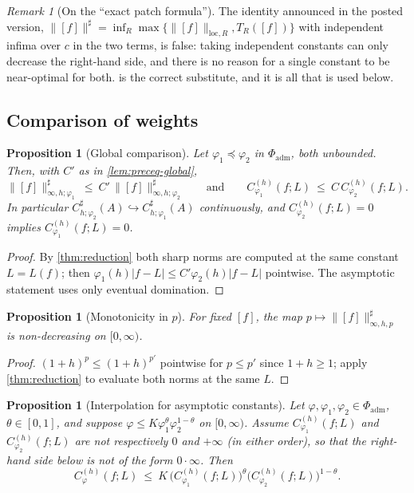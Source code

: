 \documentclass[11pt,a4paper]{article}
\numberwithin{equation}{section}
\theoremstyle{plain}
\newtheorem{proposition}[theorem]{Proposition}
\theoremstyle{definition}
\theoremstyle{remark}
\newtheorem{remark}[theorem]{Remark}
\begin{document}
\begin{remark}[On the ``exact patch formula'']
The identity announced in the posted version,
$\|[f]\|^{\sharp}=\inf_{R}\max\{\|[f]\|_{\mathrm{loc},R},T_R([f])\}$ with independent
infima over $c$ in the two terms, is false: taking independent constants can only decrease
the right-hand side, and there is no reason for a single constant to be near-optimal for
both.  is the correct substitute, and it is all that is used below.
\end{remark}

\subsection{Comparison of weights}

\begin{proposition}[Global comparison]\label{prop:global-comparison}
Let $\varphi_1\preceq\varphi_2$ in $\Phi_{\mathrm{adm}}$, both unbounded. Then, with $C'$
as in \cref{lem:preceq-global},
\[
\|[f]\|^{\sharp}_{\infty,h;\varphi_1}\ \le\ C'\,\|[f]\|^{\sharp}_{\infty,h;\varphi_2}
\qquad\text{and}\qquad
C^{(h)}_{\varphi_1}(f;L)\ \le\ C\,C^{(h)}_{\varphi_2}(f;L).
\]
In particular $C^{\sharp}_{h;\varphi_2}(A)\hookrightarrow C^{\sharp}_{h;\varphi_1}(A)$
continuously, and $C^{(h)}_{\varphi_2}(f;L)=0$ implies $C^{(h)}_{\varphi_1}(f;L)=0$.
\end{proposition}

\begin{proof}
By \cref{thm:reduction} both sharp norms are computed at the same constant $L=L(f)$;
then $\varphi_1(h)|f-L|\le C'\varphi_2(h)|f-L|$ pointwise. The asymptotic statement uses
only eventual domination.
\end{proof}

\begin{proposition}[Monotonicity in $p$]\label{prop:monotone-p}
For fixed $[f]$, the map $p\mapsto\|[f]\|^{\sharp}_{\infty,h,p}$ is non-decreasing on
$[0,\infty)$.
\end{proposition}

\begin{proof}
$(1+h)^{p}\le(1+h)^{p'}$ pointwise for $p\le p'$ since $1+h\ge1$; apply
\cref{thm:reduction} to evaluate both norms at the same $L$.
\end{proof}

\begin{proposition}[Interpolation for asymptotic constants]\label{prop:interp-asymptotic}
Let $\varphi,\varphi_1,\varphi_2\in\Phi_{\mathrm{adm}}$, $\theta\in[0,1]$, and suppose
$\varphi\le K\varphi_1^{\theta}\varphi_2^{1-\theta}$ on $[0,\infty)$. Assume
$C^{(h)}_{\varphi_1}(f;L)$ and $C^{(h)}_{\varphi_2}(f;L)$ are not respectively $0$ and
$+\infty$ (in either order), so that the right-hand side below is not of the form
$0\cdot\infty$. Then
\[
C^{(h)}_{\varphi}(f;L)\ \le\ K\,\bigl(C^{(h)}_{\varphi_1}(f;L)\bigr)^{\theta}
\bigl(C^{(h)}_{\varphi_2}(f;L)\bigr)^{1-\theta}.
\]
\end{proposition}
\end{document}
